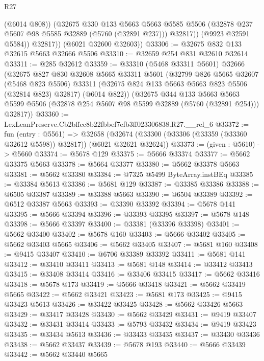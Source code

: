 \begin{lexlean}{R27}
\begin{coremodule}
                (@6014 @808))
              (@32675
                @330
                @133
                @5663
                @5663
                @5585
                @5506
                (@32878 @237 @5607 @98 @5585 @32889 (@5760 (@32891 @237)))
                @32817))
            (@9923 @32591 @5584))
          @32817))
      (@6021 @32600 @32603))
@33306 := @32675 @832 @133 @32615 @5663 @32666 @5506
@33310 := @32659 @254 @831 @32610 @32614
@33311 := @285 @32612
@33359 := @33310
    (@5468 @33311 @5601)
    @32666
    (@32675
      @827
      @830
      @32608
      @5665
      @33311
      @5601
      (@32799
        @826
        @5665
        @32607
        (@5468 @823 @5506)
        @33311
        (@32675 @824 @133 @5663 @5663 @823 @5506 (@32814 @823) @32817)
        (@6014 @822))
      (@32675
        @344
        @133
        @5663
        @5663
        @5599
        @5506
        (@32878 @254 @5607 @98 @5599 @32889 (@5760 (@32891 @254)))
        @32817))
@33360 := LexLeanPreserve.Cb2bffcc8b22fbbef7efb3ff023306838.R27.__rel_6
@33372 := fun (entry : @5561) =>
  @32658 (@32674 (@33300 (@33306 (@33359 (@33360 @32612 @5598)) @32817)) (@6021 @32621 @32624))
@33373 := (given : @5610) -> @5660
@33374 := @5678 @129
@33375 := @5666 @33374
@33377 := @5662 @33375 @5663
@33378 := @5664 @33377
@33380 := @5662 @33378 @5663
@33381 := @5662 @33380
@33384 := @7325 @5499 ByteArray.instBEq
@33385 := @33384 @5613
@33386 := @5681 @129
@33387 := @33385 @33386
@33388 := @6505 @33387
@33389 := @33388 @5663
@33390 := @6504 @33389
@33392 := @6512 @33387 @5663
@33393 := @33390 @33392
@33394 := @5678 @141
@33395 := @5666 @33394
@33396 := @33393 @33395
@33397 := @5678 @148
@33398 := @5666 @33397
@33400 := @33381 (@33396 @33398)
@33401 := @5662 @33400
@33402 := @5678 @160
@33403 := @5666 @33402
@33405 := @5662 @33403 @5665
@33406 := @5662 @33405
@33407 := @5681 @160
@33408 := @9415 @33407
@33410 := @6706 @33389 @33392
@33411 := @5681 @141
@33412 := @33410 @33411
@33413 := @5681 @148
@33414 := @33412 @33413
@33415 := @33408 @33414
@33416 := @33406 @33415
@33417 := @5662 @33416
@33418 := @5678 @173
@33419 := @5666 @33418
@33421 := @5662 @33419 @5665
@33422 := @5662 @33421
@33423 := @5681 @173
@33425 := @9415 @33423 @5613
@33426 := @33422 @33425
@33428 := @5662 @33426 @5663
@33429 := @33417 @33428
@33430 := @5662 @33429
@33431 := @9419 @33407
@33432 := @33431 @33414
@33433 := @5793 @33432
@33434 := @9419 @33423
@33435 := @33434 @5613
@33436 := @33433 @33435
@33437 := @33430 @33436
@33438 := @5662 @33437
@33439 := @5678 @193
@33440 := @5666 @33439
@33442 := @5662 @33440 @5665

\end{coremodule}
\end{lexlean}
